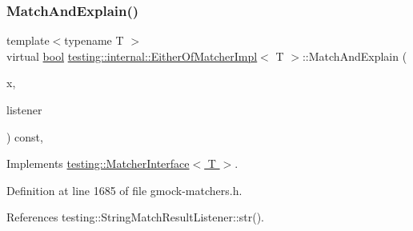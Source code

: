 \subsubsection{\texorpdfstring{Match\+And\+Explain()}{MatchAndExplain()}}
{\footnotesize\ttfamily template$<$typename T $>$ \\
virtual \hyperlink{classbool}{bool} \hyperlink{classtesting_1_1internal_1_1EitherOfMatcherImpl}{testing\+::internal\+::\+Either\+Of\+Matcher\+Impl}$<$ T $>$\+::Match\+And\+Explain (\begin{DoxyParamCaption}\item[{T}]{x,  }\item[{\hyperlink{classtesting_1_1MatchResultListener}{Match\+Result\+Listener} $\ast$}]{listener }\end{DoxyParamCaption}) const\hspace{0.3cm}{\ttfamily [inline]}, {\ttfamily [virtual]}}



Implements \hyperlink{classtesting_1_1MatcherInterface_a296b43607cd99d60365f0e6a762777cf}{testing\+::\+Matcher\+Interface$<$ T $>$}.



Definition at line 1685 of file gmock-\/matchers.\+h.



References testing\+::\+String\+Match\+Result\+Listener\+::str().


